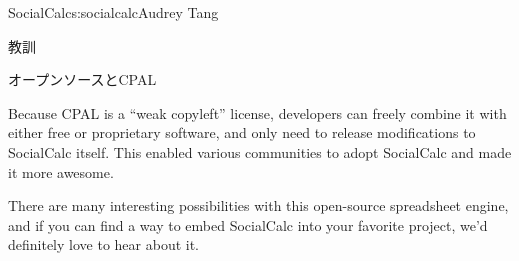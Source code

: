 \begin{aosachapter}{SocialCalc}{s:socialcalc}{Audrey Tang}
\begin{aosasect1}{教訓}
\begin{aosasect2}{オープンソースとCPAL}

Because CPAL is a ``weak copyleft'' license, developers can freely
combine it with either free or proprietary software, and only need to
release modifications to SocialCalc itself.  This enabled various
communities to adopt SocialCalc and made it more awesome.


There are many interesting possibilities with this open-source
spreadsheet engine, and if you can find a way to embed SocialCalc
into your favorite project, we'd definitely love to hear about it.

\end{aosasect2}

\end{aosasect1}

\end{aosachapter}
